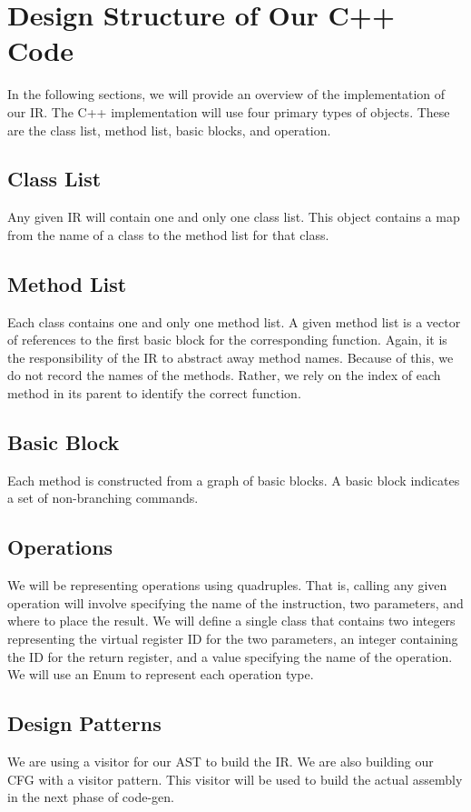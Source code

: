 \documentclass[10pt, onecolumn]{extarticle}
\begin{document}
\section{Design Structure of Our C++ Code}
In the following sections, we will provide an overview of the implementation of our IR. The C++ implementation will use four primary types of objects. These are the class list, method list, basic blocks, and operation.

\subsection{Class List}
Any given IR will contain one and only one class list. This object contains a map from the name of a class to the method list for that class.

\subsection{Method List}
Each class contains one and only one method list. A given method list is a vector of references to the first basic block for the corresponding function. Again, it is the responsibility of the IR to abstract away method names. Because of this, we do not record the names of the methods. Rather, we rely on the index of each method in its parent to identify the correct function.

\subsection{Basic Block}
Each method is constructed from a graph of basic blocks. A basic block indicates a set of non-branching commands.

\subsection{Operations}
We will be representing operations using quadruples. That is, calling any given operation will involve specifying the name of the instruction, two parameters, and where to place the result. We will define a single class that contains two integers representing the virtual register ID for the two parameters, an integer containing the ID for the return register, and a value specifying the name of the operation. We will use an Enum to represent each operation type.
\subsection{Design Patterns}
We are using a visitor for our AST to build the IR. We are also building our CFG with a visitor pattern. This visitor will be used to build the actual assembly in the next phase of code-gen.
\end{document}
